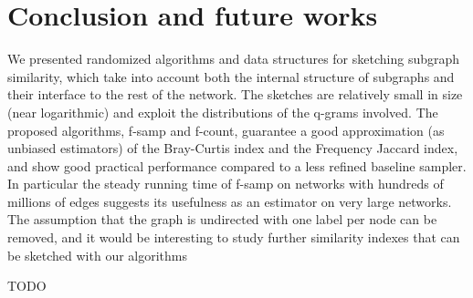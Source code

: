 \chapter{Conclusion and future works}
    
We presented randomized algorithms and data structures for sketching subgraph similarity, which take into account both the internal structure of subgraphs and their interface to the rest of the network. 
The sketches are relatively small in size (near logarithmic)
and exploit the distributions of the q-grams involved. The proposed
algorithms, f-samp and f-count, guarantee a good approximation
(as unbiased estimators) of the Bray-Curtis index and the Frequency
Jaccard index, and show good practical performance compared to a
less refined baseline sampler. In particular the steady running time
of f-samp on networks with hundreds of millions of edges suggests
its usefulness as an estimator on very large networks.
The assumption that the graph is undirected with one label per
node can be removed, and it would be interesting to study further
similarity indexes that can be sketched with our algorithms

TODO 
\clearpage